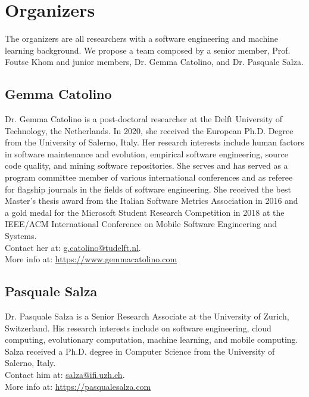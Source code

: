 
\section{Organizers}

The organizers are all researchers with a software engineering and machine learning background.
We propose a team composed by a senior member, \ie Prof. Foutse Khom and junior members, \ie Dr. Gemma Catolino, and Dr. Pasquale Salza.

\label{sec:organizers}
\subsection{Gemma Catolino}
Dr. Gemma Catolino is a post-doctoral researcher at the Delft University of Technology, the Netherlands.
In 2020, she received the European Ph.D. Degree from the University of Salerno, Italy.
Her research interests include human factors in software maintenance and evolution, empirical software engineering, source code quality, and mining software repositories.
She serves and has served as a program committee member of various international conferences and as referee for flagship journals in the fields of software engineering.
She received the best Master's thesis award from the Italian Software Metrics Association in 2016 and a gold medal for the Microsoft Student Research Competition in 2018 at the IEEE/ACM International Conference on Mobile Software Engineering and Systems.\\
Contact her at: \href{mailto:g.catolino@tudelft.nl}{g.catolino@tudelft.nl}.\\
More info at: \url{https://www.gemmacatolino.com}


\subsection{Pasquale Salza}
Dr. Pasquale Salza is a Senior Research Associate at the University of Zurich, Switzerland.
His research interests include on software engineering, cloud computing, evolutionary computation, machine learning, and mobile computing.
Salza received a Ph.D. degree in Computer Science from the University of Salerno, Italy.\\
Contact him at: \href{mailto:salza@ifi.uzh.ch}{salza@ifi.uzh.ch}.\\
More info at: \url{https://pasqualesalza.com}


